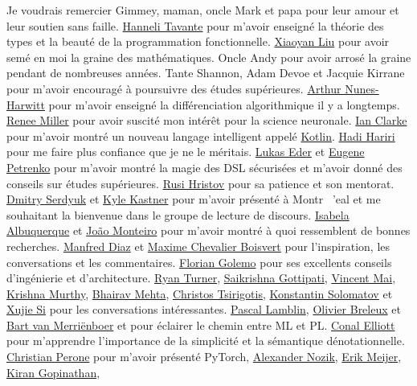 \vspace{-60pt} Je voudrais remercier Gimmey, maman, oncle Mark et papa pour leur amour et leur soutien sans faille. \href{http://hannelita.com/}{Hanneli Tavante} pour m'avoir enseigné la théorie des types et la beauté de la programmation fonctionnelle. \href{https://laverne.edu/directory/person/xiaoyan-liu/}{Xiaoyan Liu} pour avoir semé en moi la graine des mathématiques. Oncle Andy pour avoir arrosé la graine pendant de nombreuses années. Tante Shannon, Adam Devoe et Jacquie Kirrane pour m'avoir encouragé à poursuivre des études supérieures. \href{https://www.cs.rit.edu/~anh/}{Arthur Nunes-Harwitt} pour m'avoir enseigné la différenciation algorithmique il y a longtemps. \href{https://www.sas.rochester.edu/bcs/people/faculty/miller_renee/index.html}{Renee Miller} pour avoir suscité mon intérêt pour la science neuronale. \href{http://blog.locut.us}{Ian Clarke} pour m'avoir montré un nouveau langage intelligent appelé \href{https://kotlinlang.org/}{Kotlin}. \href{https://hadihariri.com/}{Hadi Hariri} pour me faire plus confiance que je ne le méritais. \href{https://www.jooq.org/}{Lukas Eder} et \href{https://jonnyzzz.com/}{Eugene Petrenko} pour m'avoir montré la magie des DSL sécurisées et m'avoir donné des conseils sur études supérieures. \href{https://github.com/rusi}{Rusi Hristov} pour sa patience et son mentorat. \href{https://scholar.google.ca/citations?user=PsKlNzUAAAAJ}{Dmitry Serdyuk} et \href{http://kastnerkyle.github.io/}{Kyle Kastner} pour m'avoir présenté à Montr \ 'eal et me souhaitant la bienvenue dans le groupe de lecture de discours. \href{https://scholar.google.ca/citations?user=-Ss9QGkAAAAJ}{Isabela Albuquerque} et \href{https://scholar.google.ca/citations?user=hkO47vsAAAAJ}{Jo\~ao Monteiro} pour m'avoir montré à quoi ressemblent de bonnes recherches. \href{https://takeitallsource.github.io}{Manfred Diaz} et \href{https://pointersgonewild.com/}{Maxime Chevalier Boisvert} pour l'inspiration, les conversations et les commentaires. \href{https://fgolemo.github.io/}{Florian Golemo} pour ses excellents conseils d'ingénierie et d'architecture. \href{http://TurnerComputing.com}{Ryan Turner}, \href{https://saikrishna-1996.github.io}{Saikrishna Gottipati}, \href{https://maivincent.github.io}{Vincent Mai}, \href{https://krrish94.github.io/}{Krishna Murthy}, \href{https://bhairavmehta95.github.io/}{Bhairav ​​Mehta}, \href{https://mila.quebec/fr/person/christos-tsirigotis/}{Christos Tsirigotis}, \href{http://www.solomatov.me/}{Konstantin Solomatov} et \href{https://www.seas.upenn.edu/~ xsi/}{Xujie Si} pour les conversations intéressantes. \href{https://scholar.google.ca/citations?user=bn4xHHIAAAAJ}{Pascal Lamblin}, \href{http://breuleux.net}{Olivier Breleux} et \href{https://scholar.google.ca/citations? user = XE9SDzgAAAAJ}{Bart van Merri\"enboer} et pour éclairer le chemin entre ML et PL. \href{http://conal.net/}{Conal Elliott} pour m'apprendre l'importance de la simplicité et la sémantique dénotationnelle. \href{http://christianperone.com}{Christian Perone} pour m'avoir présenté PyTorch, \href{https://research.jetbrains.org/researchers/altavir}{Alexander Nozik}, \href{https://twitter.com/headinthebox}{Erik Meijer}, \href{https://scholar.google.com/citations?user=IcuGXgcAAAAJ}{Kiran Gopinathan}, 